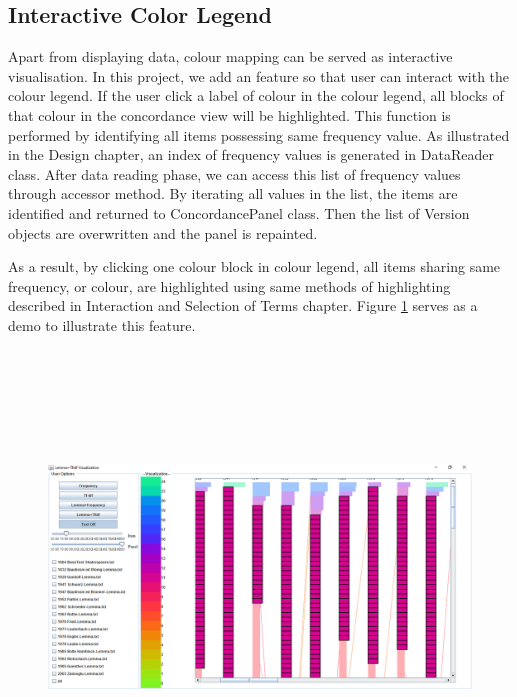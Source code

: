 \subsection{Interactive Color Legend}

Apart from displaying data, colour mapping can be served as interactive visualisation. In this project, we add an feature so that user can interact with the colour legend. If the user click a label of colour in the colour legend, all blocks of that colour in the concordance view will be highlighted. This function is performed by identifying all items possessing same frequency value. As illustrated in the Design chapter, an index of frequency values is generated in DataReader class. After data reading phase, we can access this list of frequency values through accessor method. By iterating all values in the list, the items are identified and returned to ConcordancePanel class. Then the list of Version objects are overwritten and the panel is repainted.

As a result, by clicking one colour block in colour legend, all items sharing same frequency, or colour, are highlighted using same methods of highlighting described in Interaction and Selection of Terms chapter. Figure \ref{fig:interactiveColourMapping} serves as a demo to illustrate this feature.
\begin{figure}[H]
	\centering	
	\includegraphics[width=16cm, height=12cm]{Figs/Colour-Legend-Interation}\\[1ex]
	\caption{}
	\label{fig:interactiveColourMapping}
\end{figure} 

